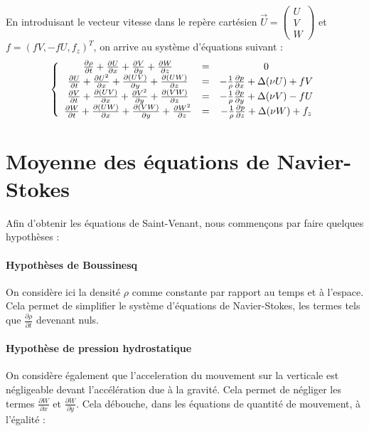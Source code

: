 En introduisant le vecteur vitesse dans le repère cartésien $\overrightarrow{U}=\begin{pmatrix} U \\ V \\ W \end{pmatrix}$ et $f=(fV,-fU,f_z)^T$, on arrive au système d'équations suivant :
\[\left\{ \begin{array}{c c c}
	\frac{\partial \rho}{\partial t} + \frac{\partial U}{\partial x} + \frac{\partial V}{\partial y} +\frac{\partial W}{\partial z}&=&0\\
     \frac{\partial U}{\partial t} + \frac{\partial U^2}{\partial x} + \frac{\partial (UV)}{\partial y} +\frac{\partial (UW)}{\partial z} &=& -\frac{1}{\rho}\frac{\partial p}{\partial x} + \Delta(\nu U)+fV\\
	\frac{\partial V}{\partial t} + \frac{\partial (UV)}{\partial x} + \frac{\partial V^2}{\partial y} +\frac{\partial (VW)}{\partial z} &=& -\frac{1}{\rho}\frac{\partial p}{\partial y} + \Delta(\nu V)-fU\\
	\frac{\partial W}{\partial t} + \frac{\partial (UW)}{\partial x} + \frac{\partial (VW)}{\partial y} +\frac{\partial W^2}{\partial z} &=& -\frac{1}{\rho}\frac{\partial p}{\partial z} + \Delta(\nu W)+f_z
\end{array}\right.\]


\section{Moyenne des équations de Navier-Stokes}
Afin d'obtenir les équations de Saint-Venant, nous commençons par faire quelques hypothèses :
	\paragraph{Hypothèses de Boussinesq}
On considère ici la densité $\rho$ comme constante par rapport au temps et à l'espace. Cela permet de simplifier le système d'équations de Navier-Stokes, les termes tels que $\frac{\partial \rho}{\partial t}$ devenant nuls.

	\paragraph{Hypothèse de pression hydrostatique}
On considère également que l'acceleration du mouvement sur la verticale est négligeable devant l'accélération due à la gravité. Cela permet de négliger les termes $\frac{\partial W}{\partial x}$ et $\frac{\partial W}{\partial y}$. Cela débouche, dans les équations de quantité de mouvement, à l'égalité :


